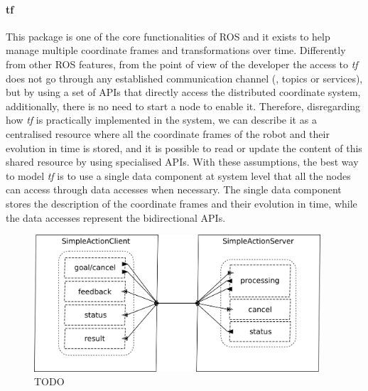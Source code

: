 \paragraph{tf} This package is one of the core functionalities of ROS and it exists to help manage multiple coordinate frames and transformations over time. Differently from other ROS features, from the point of view of the developer the access to \textit{tf} does not go through any established communication channel (\ie, topics or services), but by using a set of APIs that directly access the distributed coordinate system, additionally, there is no need to start a node to enable it. Therefore, disregarding how \textit{tf} is practically implemented in the system, we can describe it as a centralised resource where all the coordinate frames of the robot and their evolution in time is stored, and it is possible to read or update the content of this shared resource by using specialised APIs. With these assumptions, the best way to model \textit{tf} is to use a single data component at system level that all the nodes can access through data accesses when necessary. The single data component stores the description of the coordinate frames and their evolution in time, while the data accesses represent the bidirectional APIs.

\begin{figure}[t]
    \centering
    \includegraphics[width=0.95\textwidth]{gfx/action}
    \caption{TODO}\label{fig:action}
\end{figure}

